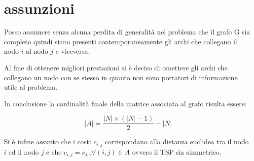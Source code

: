%
%
\section[Assunzioni]{assunzioni}
\label{pt1:assumption}
Posso assumere senza alcuna perdita di generalità nel problema che il grafo G sia completo quindi siano presenti contemporaneamente gli archi che collegano il nodo $i$ al nodo $j$ e viceversa.

Al fine di ottenere migliori prestazioni si è deciso di omettere gli archi che collegano un nodo con se stesso in quanto non sono portatori di informazione utile al problema.

In conclusione la cardinalità finale della matrice associata al grafo risulta essere:

\begin{equation}
\left|A\right| = \frac{\left|N\right|\times\left(\left|N\right|-1\right)}{2} - \left|N\right|
\end{equation}

Si è infine assunto che i costi $c_{i,j}$ corrispondano alla distanza euclidea tra il nodo $i$ ed il nodo $j$ e che $c_{i,j}=c_{j,i} \forall (i,j)\in A$ ovvero il TSP sia simmetrico.